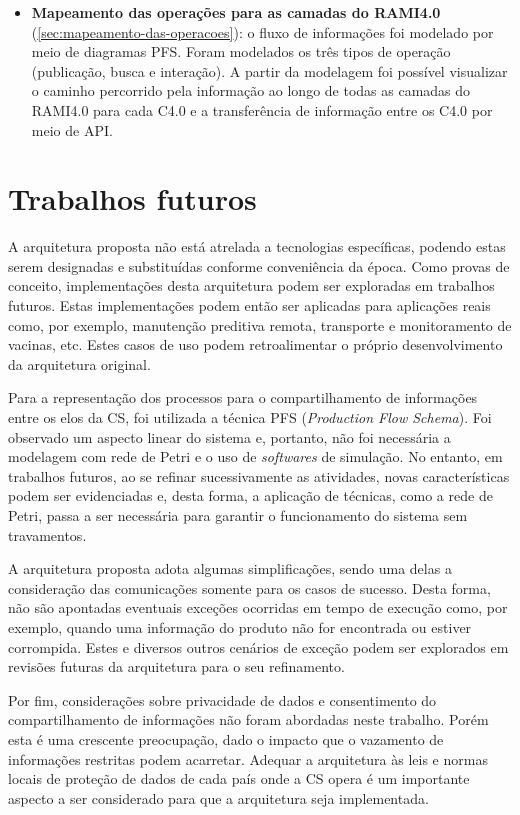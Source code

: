 \begin{itemize}
	\item \textbf{Mapeamento das operações para as camadas do RAMI4.0} (\autoref{sec:mapeamento-das-operacoes}): o fluxo de informações foi modelado por meio de diagramas PFS. Foram modelados os três tipos de operação (publicação, busca e interação). A partir da modelagem foi possível visualizar o caminho percorrido pela informação ao longo de todas as camadas do RAMI4.0 para cada C4.0 e a transferência de informação entre os C4.0 por meio de API.
\end{itemize}

\section{Trabalhos futuros}

A arquitetura proposta não está atrelada a tecnologias específicas, podendo estas serem designadas e substituídas conforme conveniência da época. Como provas de conceito, implementações desta arquitetura podem ser exploradas em trabalhos futuros. Estas implementações podem então ser aplicadas para aplicações reais como, por exemplo, manutenção preditiva remota, transporte e monitoramento de vacinas, etc. Estes casos de uso podem retroalimentar o próprio desenvolvimento da arquitetura original.

Para a representação dos processos para o compartilhamento de informações entre os elos da CS, foi utilizada a técnica PFS (\textit{Production Flow Schema}). Foi observado um aspecto linear do sistema e, portanto, não foi necessária a modelagem com rede de Petri e o uso de \textit{softwares} de simulação. No entanto, em trabalhos futuros, ao se refinar sucessivamente as atividades, novas características podem ser evidenciadas e, desta forma, a aplicação de técnicas, como a rede de Petri, passa a ser necessária para garantir o funcionamento do sistema sem travamentos.

A arquitetura proposta adota algumas simplificações, sendo uma delas a consideração das comunicações somente para os casos de sucesso. Desta forma, não são apontadas eventuais exceções ocorridas em tempo de execução como, por exemplo, quando uma informação do produto não for encontrada ou estiver corrompida. Estes e diversos outros cenários de exceção podem ser explorados em revisões futuras da arquitetura para o seu refinamento.

Por fim, considerações sobre privacidade de dados e consentimento do compartilhamento de informações não foram abordadas neste trabalho. Porém esta é uma crescente preocupação, dado o impacto que o vazamento de informações restritas podem acarretar. Adequar a arquitetura às leis e normas locais de proteção de dados de cada país onde a CS opera é um importante aspecto a ser considerado para que a arquitetura seja implementada.

